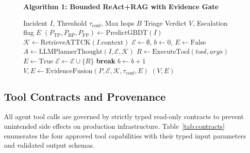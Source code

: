 \begin{figure}[!h]
\begin{minipage}{\columnwidth}
\hrulefill\par
\vspace{2pt}
\textbf{Algorithm 1: Bounded ReAct+RAG with Evidence Gate}\par
\vspace{2pt}
\hrulefill\par
\vspace{4pt}
\small
\begin{algorithmic}[1]
\REQUIRE Incident $I$, Threshold $\tau_{\text{conf}}$, Max hops $B$
\ENSURE Triage Verdict $V$, Escalation flag $E$
\STATE $(P_{\text{TP}}, P_{\text{BP}}, P_{\text{FP}}) \leftarrow \text{PredictGBDT}(I)$
\STATE $\mathcal{K} \leftarrow \text{RetrieveATTCK}(I.\text{context})$
\STATE $\mathcal{E} \leftarrow \emptyset$, $b \leftarrow 0$, $E \leftarrow \text{False}$
    \STATE $A \leftarrow \text{LLMPlannerThought}(I, \mathcal{E}, \mathcal{K})$
        \STATE $R \leftarrow \text{ExecuteTool}(tool, args)$
            \STATE $E \leftarrow \text{True}$ 
        \ENDIF
        \STATE $\mathcal{E} \leftarrow \mathcal{E} \cup \{R\}$
        \STATE \textbf{break}
    \ENDIF
    \STATE $b \leftarrow b + 1$
\ENDWHILE
\STATE $V, E \leftarrow \text{EvidenceFusion}(P, \mathcal{E}, \mathcal{K}, \tau_{\text{conf}}, E)$
\RETURN $(V, E)$
\end{algorithmic}
\vspace{2pt}
\hrulefill
\end{minipage}
\end{figure}

\subsection{Tool Contracts and Provenance}

All agent tool calls are governed by strictly typed read-only contracts to prevent
unintended side effects on production infrastructure. Table~\ref{tab:contracts}
enumerates the four approved tool capabilities with their typed input parameters
and validated output schemas.


